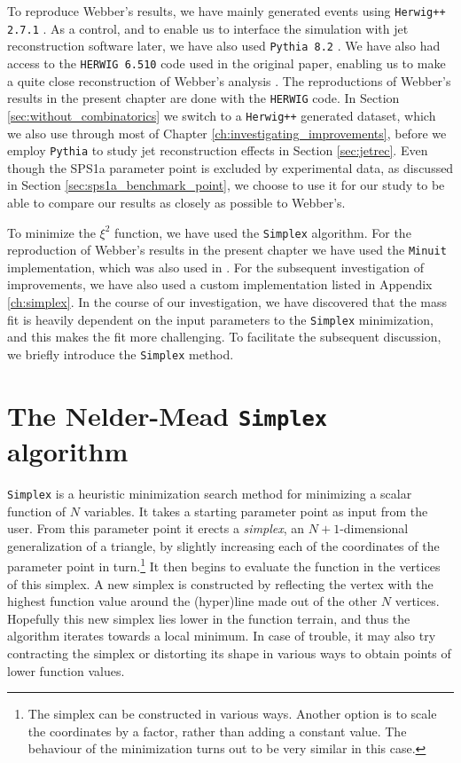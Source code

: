 \documentclass[twoside,english]{uiofysmaster}
\begin{document}
To reproduce Webber's results, we have mainly generated events using {\tt Herwig++ 2.7.1} \cite{Bahr:2008pv}. As a control, and to enable us to interface the simulation with jet reconstruction software later, we have also used {\tt Pythia 8.2} \cite{Sjostrand:2014zea}. We have also had access to the {\tt HERWIG 6.510} code used in the original paper, enabling us to make a quite close reconstruction of Webber's analysis \cite{Webber:epost}. The reproductions of Webber's results in the present chapter are done with the {\tt HERWIG} code. In Section \ref{sec:without_combinatorics} we switch to a {\tt Herwig++} generated dataset, which we also use through most of Chapter \ref{ch:investigating_improvements}, before we employ {\tt Pythia} to study jet reconstruction effects in Section \ref{sec:jetrec}. Even though the SPS1a parameter point is excluded by experimental data, as discussed in Section \ref{sec:sps1a_benchmark_point}, we choose to use it for our study to be able to compare our results as closely as possible to Webber's.

To minimize the $\xi^2$ function, we have used the {\tt Simplex} algorithm. For the reproduction of Webber's results in the present chapter we have used the {\tt Minuit} implementation, which was also used in \cite{Webber:2009vm}. For the subsequent investigation of improvements, we have also used a custom implementation listed in Appendix \ref{ch:simplex}. In the course of our investigation, we have discovered that the mass fit is heavily dependent on the input parameters to the {\tt Simplex} minimization, and this makes the fit more challenging. To facilitate the subsequent discussion, we briefly introduce the {\tt Simplex} method.

\section{The Nelder-Mead {\tt Simplex} algorithm}
\label{sec:simplex_discussion}
{\tt Simplex} \cite{nelder1965simplex} is a heuristic minimization search method for minimizing a scalar function of $N$ variables. It takes a starting parameter point as input from the user. From this parameter point it erects a {\it simplex}, an $N+1$-dimensional generalization of a triangle, by slightly increasing each of the coordinates of the parameter point in turn.\footnote{The simplex can be constructed in various ways. Another option is to scale the coordinates by a factor, rather than adding a constant value. The behaviour of the minimization turns out to be very similar in this case.} It then begins to evaluate the function in the vertices of this simplex. A new simplex is constructed by reflecting the vertex with the highest function value around the (hyper)line made out of the other $N$ vertices. Hopefully this new simplex lies lower in the function terrain, and thus the algorithm iterates towards a local minimum. In case of trouble, it may also try contracting the simplex or distorting its shape in various ways to obtain points of lower function values. 
\end{document}
